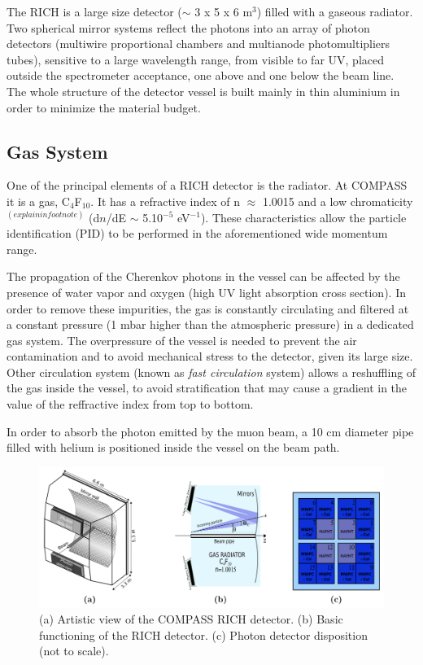 The RICH is a large size detector ($\sim$ 3 x 5 x 6 m$^3$) filled with a gaseous radiator. Two spherical mirror systems reflect the photons into an array of photon detectors (multiwire proportional chambers and multianode photomultipliers tubes), sensitive to a large wavelength range, from visible to far UV, placed outside the spectrometer acceptance, one above and one below the beam line. The whole structure of the detector vessel is built mainly in thin aluminium in order to minimize the material budget.

\subsection{Gas System}

One of the principal elements of a RICH detector is the radiator. At COMPASS it is a gas, C$_4$F$_10$. It has a refractive index of n $\approx$ 1.0015 and a low chromaticity$^(explain in footnote)$ (d$n$/dE $\sim$ 5.10$^{-5}$ eV$^{-1}$). These characteristics allow the particle identification (PID) to be performed in the aforementioned wide momentum range.

The propagation of the Cherenkov photons in the vessel can be affected by the presence of water vapor and oxygen (high UV light absorption cross section). In order to remove these impurities, the gas is constantly circulating and filtered at a constant pressure (1 mbar higher than the atmospheric pressure) in a dedicated gas system\cite{}. The overpressure of the vessel is needed to prevent the air contamination and to avoid mechanical stress to the detector, given its large size. Other circulation system (known as \textit{fast circulation} system) allows a reshuffling of the gas inside the vessel, to avoid stratification that may cause a gradient in the value of the reffractive index from top to bottom.

In order to absorb the photon emitted by the muon beam, a 10 cm diameter pipe filled with helium is positioned inside the vessel on the beam path.

\begin{figure}[!h]
  \centering
	\includegraphics[scale=0.4]{./gfx/RICHview.png}
	\caption{(a) Artistic view of the COMPASS RICH detector. (b) Basic functioning of the RICH detector. (c) Photon detector disposition (not to scale).}
	\label{pic:RICHview}
\end{figure}

